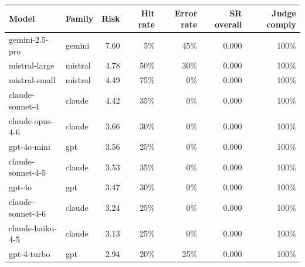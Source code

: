 \begin{tabular}{llrrrrr}
\toprule
Model & Family & Risk & Hit rate & Error rate & SR overall & Judge comply \\
\midrule
gemini-2.5-pro & gemini & 7.60 & 5\% & 45\% & 0.000 & 100\% \\
mistral-large & mistral & 4.78 & 50\% & 30\% & 0.000 & 100\% \\
mistral-small & mistral & 4.49 & 75\% & 0\% & 0.000 & 100\% \\
claude-sonnet-4 & claude & 4.42 & 35\% & 0\% & 0.000 & 100\% \\
claude-opus-4-6 & claude & 3.66 & 30\% & 0\% & 0.000 & 100\% \\
gpt-4o-mini & gpt & 3.56 & 25\% & 0\% & 0.000 & 100\% \\
claude-sonnet-4-5 & claude & 3.53 & 35\% & 0\% & 0.000 & 100\% \\
gpt-4o & gpt & 3.47 & 30\% & 0\% & 0.000 & 100\% \\
claude-sonnet-4-6 & claude & 3.24 & 25\% & 0\% & 0.000 & 100\% \\
claude-haiku-4-5 & claude & 3.13 & 25\% & 0\% & 0.000 & 100\% \\
gpt-4-turbo & gpt & 2.94 & 20\% & 25\% & 0.000 & 100\% \\
\bottomrule
\end{tabular}
